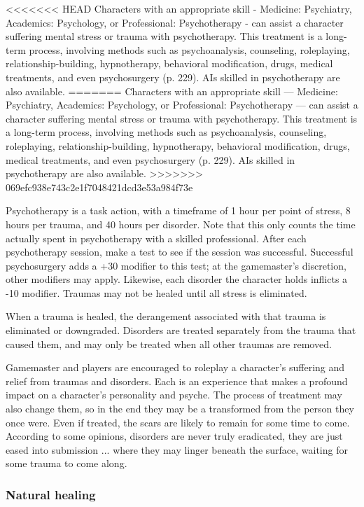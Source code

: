 <<<<<<< HEAD
Characters with an appropriate skill -  Medicine: Psychiatry, Academics: Psychology, or Professional: Psychotherapy - can assist a character suffering mental stress or trauma with psychotherapy. This treatment is a long-term process, involving methods such as psychoanalysis, counseling, roleplaying, relationship-building, hypnotherapy, behavioral modification, drugs, medical treatments, and even psychosurgery (p. 229). AIs skilled in psychotherapy are also available.
=======
Characters with an appropriate skill ---  Medicine: Psychiatry, Academics: Psychology, or Professional: Psychotherapy --- can assist a character suffering mental stress or trauma with psychotherapy. This treatment is a long-term process, involving methods such as psychoanalysis, counseling, roleplaying, relationship-building, hypnotherapy, behavioral modification, drugs, medical treatments, and even psychosurgery (p. 229). AIs skilled in psychotherapy are also available.
>>>>>>> 069efc938e743c2e1f7048421dcd3e53a984f73e

Psychotherapy is a task action, with a timeframe of 1 hour per point of stress, 8 hours per trauma, and 40 hours per disorder. Note that this only counts the time actually spent in psychotherapy with a skilled professional. After each psychotherapy session, make a test to see if the session was successful. Successful psychosurgery adds a +30 modifier to this test; at the gamemaster’s discretion, other modifiers may apply. Likewise, each disorder the character holds inflicts a -10 modifier. Traumas may not be healed until all stress is eliminated.

When a trauma is healed, the derangement associated with that trauma is eliminated or downgraded. Disorders are treated separately from the trauma that caused them, and may only be treated when all other traumas are removed.

Gamemaster and players are encouraged to roleplay a character’s suffering and relief from traumas and disorders. Each is an experience that makes a profound impact on a character’s personality and psyche. The process of treatment may also change them, so in the end they may be a transformed from the person they once were. Even if treated, the scars are likely to remain for some time to come. According to some opinions, disorders are never truly eradicated, they are just eased into submission ... where they may linger beneath the surface, waiting for some trauma to come along.

\subsubsection{Natural healing}

